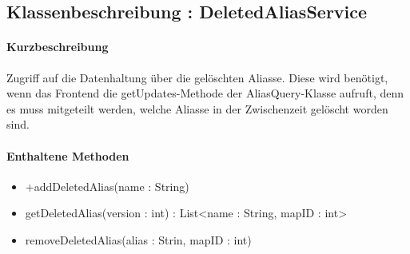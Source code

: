 \subsection{Klassenbeschreibung : DeletedAliasService}%
\paragraph*{Kurzbeschreibung}
Zugriff auf die Datenhaltung über die gelöschten Aliasse. Diese wird benötigt, wenn das Frontend die getUpdates-Methode der AliasQuery-Klasse aufruft, 
denn es muss mitgeteilt werden, welche Aliasse in der Zwischenzeit gelöscht worden sind.

\paragraph*{Enthaltene Methoden}
\begin{itemize}
    \item +addDeletedAlias(name : String)
    \item getDeletedAlias(version : int) : List<name : String, mapID : int>
    \item removeDeletedAlias(alias : Strin, mapID : int)
\end{itemize}